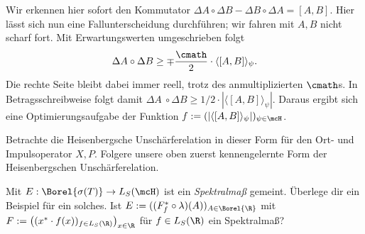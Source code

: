 \documentclass{subfiles}
\begin{document}
        Wir erkennen hier sofort den Kommutator $\Delta A\circ\Delta B-\Delta B\circ\Delta A = [A,B]$. Hier lässt sich nun eine Fallunterscheidung durchführen; wir fahren mit $A,B$ nicht scharf fort. Mit Erwartungswerten umgeschrieben folgt
        \[\Delta A\circ\Delta B\geq \mp\frac{\cmath}{2}\cdot\langle[A,B]\rangle_\psi.\]
        Die rechte Seite bleibt dabei immer reell, trotz des anmultiplizierten $\cmath$s. In Betragsschreibweise folgt damit $\Delta A\
        \circ\Delta B\geq 1/2\cdot|\langle[A,B]\rangle_\psi|$. Daraus ergibt sich eine Optimierungsaufgabe der Funktion $f:=(|\langle[A,B]\rangle_\psi|)_{\psi\in\mcH}$. 

        \begin{Aufgabe}
            \nr{} Betrachte die Heisenbergsche Unschärferelation in dieser Form für den Ort- und Impulsoperator $X,P$. Folgere unsere oben zuerst kennengelernte Form der Heisenbergschen Unschärferelation.

            \nr{} Mit $E:\Borel{\sigma(T)}\to L_S(\mcH)$ ist ein \emph{Spektralmaß} gemeint. Überlege dir ein Beispiel für ein solches. Ist $E:=((F_f^*\circ\lambda)(A))_{A\in\Borel{\R}}$ mit $F:=\big((x^*\cdot f(x))_{f\in L_S(\R)}\big)_{x\in\R}$ für $f\in L_S(\R)$ ein Spektralmaß?
        \end{Aufgabe}
        
\end{document}
